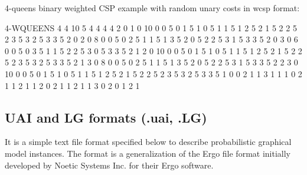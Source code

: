 \documentclass{article}
\begin{document}
4-\/queens binary weighted C\-S\-P example with random unary costs in wcsp format\-: 
\begin{DoxyCode}
4-WQUEENS 4 4 10 5
4 4 4 4
2 0 1 0 10
0 0 5
0 1 5
1 0 5
1 1 5
1 2 5
2 1 5
2 2 5
2 3 5
3 2 5
3 3 5
2 0 2 0 8
0 0 5
0 2 5
1 1 5
1 3 5
2 0 5
2 2 5
3 1 5
3 3 5
2 0 3 0 6
0 0 5
0 3 5
1 1 5
2 2 5
3 0 5
3 3 5
2 1 2 0 10
0 0 5
0 1 5
1 0 5
1 1 5
1 2 5
2 1 5
2 2 5
2 3 5
3 2 5
3 3 5
2 1 3 0 8
0 0 5
0 2 5
1 1 5
1 3 5
2 0 5
2 2 5
3 1 5
3 3 5
2 2 3 0 10
0 0 5
0 1 5
1 0 5
1 1 5
1 2 5
2 1 5
2 2 5
2 3 5
3 2 5
3 3 5
1 0 0 2
1 1
3 1
1 1 0 2
1 1
2 1
1 2 0 2
1 1
2 1
1 3 0 2
0 1
2 1
\end{DoxyCode}
 

\subsection{UAI and LG formats (.uai, .LG)}

It is a simple text file format specified below to describe probabilistic graphical model instances. The format is a generalization of the Ergo file format initially developed by Noetic Systems Inc. for their Ergo software.
\end{document}
